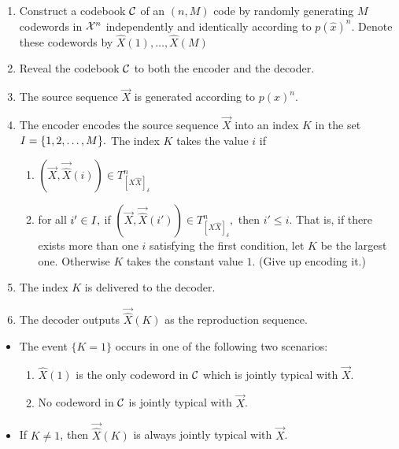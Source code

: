 \documentclass[../main.tex]{subfiles}
\begin{document}
\begin{enumerate}
    \item Construct a codebook $\mathcal{C}$ of an $(n,M)$ code by randomly generating $M$ codewords in $\mathcal{X}^n$ independently and identically according to $p(\hat x)^n.$ Denote these codewords by $\hat X(1),\dots,\hat X(M)$
    \item Reveal the codebook $\mathcal{C}$ to both the encoder and the decoder.
    \item The source sequence $\vec X$ is generated according to $p(x)^n.$
    \item The encoder encodes the source sequence $\vec X$ into an index $K$ in the set $I=\{1,2,\dots, M\}.$ The index $K$ takes the value $i$ if \begin{enumerate}
        \item $(\vec X, \vec{\hat X}(i))\in T^n_{[X\hat X]_\delta}$
        \item for all $i'\in I,$ if $(\vec X, \vec{\hat X}(i'))\in T^n_{[X\hat X]_\delta},$ then $i'\leq i.$ 
        \newline
        That is, if there exists more than one $i$ satisfying the first condition, let $K$ be the largest one. Otherwise $K$ takes the constant value $1.$ (Give up encoding it.)
    \end{enumerate}
    \item The index $K$ is delivered to the decoder.
    \item The decoder outputs $\vec{\hat X}(K)$ as the reproduction sequence.
 \end{enumerate}
 \begin{remark}
     \begin{itemize}
         \item The event $\{K=1\}$ occurs in one of the following two scenarios: \begin{enumerate}
             \item $\hat X(1)$ is the only codeword in $\mathcal{C}$ which is jointly typical with $\vec X$.
             \item No codeword in $\mathcal{C}$ is jointly typical with $\vec X$.
         \end{enumerate}
         \item If $K\neq 1$, then $\vec{\hat X}(K)$ is always jointly typical with $\vec X$.
     \end{itemize}
 \end{remark}
\end{document}

